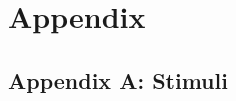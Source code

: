 \documentclass[
  english,
  doc,12pt,twoside,floatsintext]{apa7}
\begin{document}
\justify

\newpage

\hypertarget{appendix}{%
\section*{Appendix}\label{appendix}}

\hypertarget{appendix-a-stimuli}{%
\subsection*{Appendix A: Stimuli}\label{appendix-a-stimuli}}

\bigskip

\setcounter{table}{0}
\renewcommand{\thetable}{A\arabic{table}}
\end{document}
